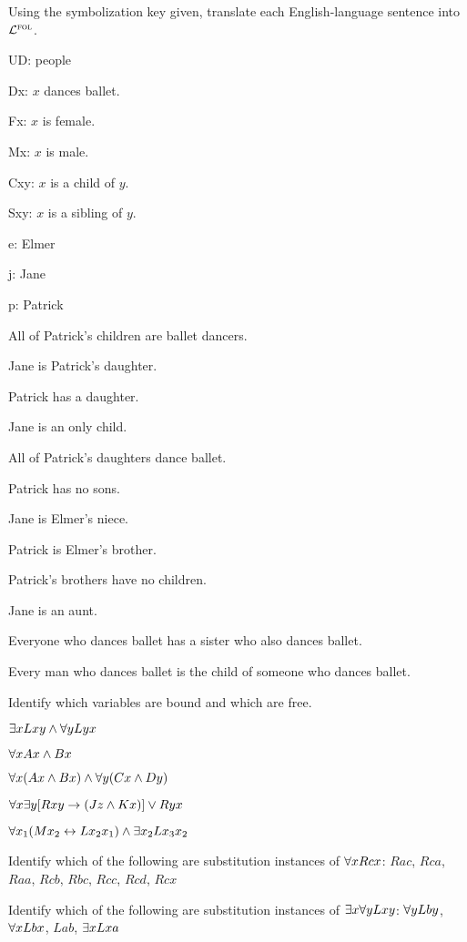 \solutions
\problempart
\label{pr.$\FOL$ballet}
Using the symbolization key given, translate each English-language sentence into $\FOL$.
\begin{ekey}
\item[UD:] people
\item[Dx:] $x$ dances ballet.
\item[Fx:] $x$ is female.
\item[Mx:] $x$ is male.
\item[Cxy:] $x$ is a child of $y$.
\item[Sxy:] $x$ is a sibling of $y$.
\item[e:] Elmer
\item[j:] Jane
\item[p:] Patrick
\end{ekey}
\begin{earg}
\item All of Patrick's children are ballet dancers.
\item Jane is Patrick's daughter.
\item Patrick has a daughter.
\item Jane is an only child.
\item All of Patrick's daughters dance ballet.
\item Patrick has no sons.
\item Jane is Elmer's niece.
\item Patrick is Elmer's brother.
\item Patrick's brothers have no children.
\item Jane is an aunt.
\item Everyone who dances ballet has a sister who also dances ballet.
\item Every man who dances ballet is the child of someone who dances ballet.
\end{earg}

\problempart
\label{pr.free$\FOL$}
Identify which variables are bound and which are free.
\begin{earg}
\item $\exists x Lxy \wedge \forall y Lyx$
\item $\forall x Ax \wedge Bx$
\item $\forall x (Ax \wedge Bx) \wedge \forall y(Cx \wedge Dy)$
\item $\forall x\exists y[Rxy \rightarrow (Jz \wedge Kx)] \vee Ryx$
\item $\forall x_1(Mx_2 \leftrightarrow Lx_2x_1) \wedge \exists x_2 Lx_3x_2$
\end{earg}

\solutions
\problempart
\label{pr.subinstance$\FOL$}
\begin{earg}
\item Identify which of the following are substitution instances of $\forall x Rcx$: $Rac$, $Rca$, $Raa$, $Rcb$, $Rbc$, $Rcc$, $Rcd$, $Rcx$
\item Identify which of the following are substitution instances of $\exists x\forall y Lxy$:
$\forall y Lby$, $\forall x Lbx$, $Lab$, $\exists x Lxa$
\end{earg}


\fi
